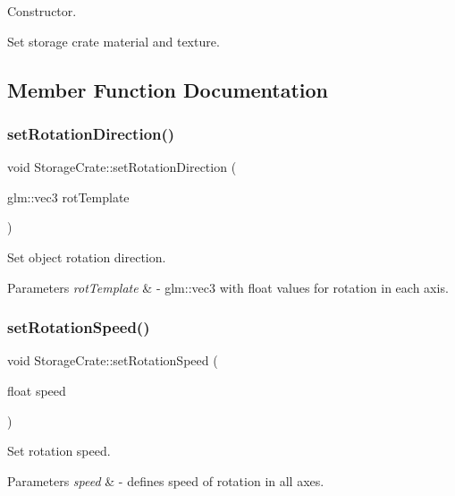 Constructor. 

Set storage crate material and texture. 

\subsection{Member Function Documentation}
\mbox{\label{class_storage_crate_ad0e3a1eabd7fdca9bb8bf2d7106cafab}} 
\subsubsection{\texorpdfstring{setRotationDirection()}{setRotationDirection()}}
{\footnotesize\ttfamily void Storage\+Crate\+::set\+Rotation\+Direction (\begin{DoxyParamCaption}\item[{glm\+::vec3}]{rot\+Template }\end{DoxyParamCaption})}



Set object rotation direction. 


\begin{DoxyParams}{Parameters}
{\em rot\+Template} & -\/ glm\+::vec3 with float values for rotation in each axis. \\
\hline
\end{DoxyParams}
\mbox{\label{class_storage_crate_ae68f13fa51f9306b641fbb8944eae60c}} 
\subsubsection{\texorpdfstring{setRotationSpeed()}{setRotationSpeed()}}
{\footnotesize\ttfamily void Storage\+Crate\+::set\+Rotation\+Speed (\begin{DoxyParamCaption}\item[{float}]{speed }\end{DoxyParamCaption})}



Set rotation speed. 


\begin{DoxyParams}{Parameters}
{\em speed} & -\/ defines speed of rotation in all axes. \\
\hline
\end{DoxyParams}
\mbox{\label{class_storage_crate_a44efdd9b2cb799a3667667bbd83be376}} 
